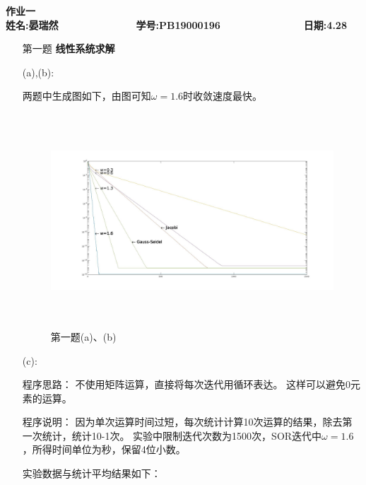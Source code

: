 \documentclass[12pt,a4paper,utf8]{ctexart}
\begin{document}


\begin{center}
\textbf{作业一}\\
\textbf{姓名:晏瑞然~~~~~~~~~~~~~ 学号:PB19000196~~~~~~~~~~~~~~ 日期:4.28}\\
\end{center}

\begin{center}
\fbox{
\begin{minipage}{40em}
\vspace{5cm}
\hspace{20cm}
\end{minipage}}
\end{center}
\vspace{1cm}

\begin{enumerate}
\item[第一题] \textbf{线性系统求解}  

(a),(b):

两题中生成图如下，由图可知$\omega=1.6$时收敛速度最快。

\begin{figure}[h]
   \centering
   \includegraphics[width=15cm,height=8cm]{ex1_2.jpg}
   \caption{第一题(a)、(b)}
\end{figure}

(c):

程序思路：
不使用矩阵运算，直接将每次迭代用循环表达。
这样可以避免0元素的运算。

程序说明：
因为单次运算时间过短，每次统计计算10次运算的结果，除去第一次统计，统计10-1次。
实验中限制迭代次数为1500次，SOR迭代中$\omega=1.6$，所得时间单位为秒，保留4位小数。

实验数据与统计平均结果如下：


\end{enumerate}
\end{document}
